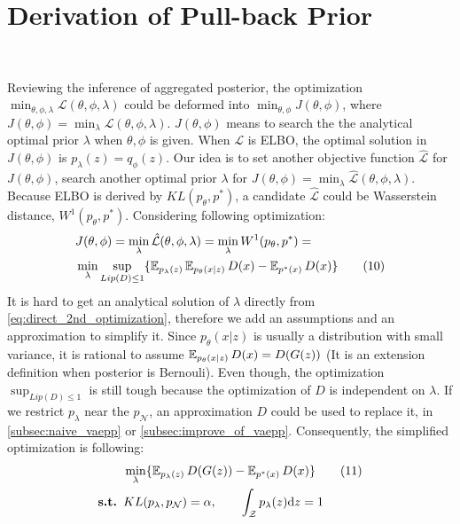 \section{Derivation of Pull-back Prior}~\label{subsec:inference}

Reviewing the inference of aggregated posterior, the optimization $\min_{\theta, \phi, \lambda} \mathcal{L}(\theta, \phi, \lambda)$ could be deformed into $\min_{\theta, \phi} J(\theta, \phi)$, where $J(\theta, \phi) = \min_{\lambda} \mathcal{L}(\theta, \phi, \lambda)$. $J(\theta, \phi)$ means to search the the analytical optimal prior $\lambda$ when $\theta, \phi$ is given. When $\mathcal{L}$ is ELBO, the optimal solution in $J(\theta, \phi)$ is $p_\lambda(z) = q_\phi(z)$. Our idea is to set another objective function $\hat{\mathcal{L}}$ for $J(\theta, \phi)$, \IE search another optimal prior $\lambda$ for $J(\theta, \phi) = \min_{\lambda} \hat{\mathcal{L}}(\theta, \phi, \lambda)$. Because ELBO is derived by $KL(p_\theta, p^*)$, a candidate $\hat{\mathcal{L}}$ could be Wasserstein distance, $W^1(p_\theta, p^*)$. Considering following optimization:
\begin{align*}\label{eq:direct_2nd_optimization}
	& J(\theta, \phi) = \min_{\lambda} \hat{\mathcal{L}}(\theta, \phi, \lambda) = \min_{\lambda} W^1(p_\theta, p^*) = \\
	& \min_{\lambda} \sup_{Lip(D) \leq 1} \{\operatorname{\mathbb{E}}_{p_\lambda(z)} \operatorname{\mathbb{E}}_{p_\theta(x|z)} D(x)  - \operatorname{\mathbb{E}}_{p^*(x)} D(x)\} 
	\tag{10}
\end{align*}
It is hard to get an analytical solution of $\lambda$ directly from \cref{eq:direct_2nd_optimization}, therefore we add an assumptions and an approximation to simplify it. Since $p_\theta(x|z)$ is usually a distribution with small variance, it is rational to assume $\operatorname{\mathbb{E}}_{p_\theta(x|z)} D(x) = D(G(z))$ (It is an extension definition when posterior is Bernouli). Even though, the optimization $\sup_{Lip(D) \leq 1}$ is still tough because the optimization of $D$ is independent on $\lambda$. If we restrict $p_\lambda$ near the $p_\mathcal{N}$, an approximation $D$ could be used to replace it, \EG in \cref{subsec:naive_vaepp} or \cref{subsec:improve_of_vaepp}. Consequently, the simplified optimization is following:
\begin{align*}\label{eq:final_optimization}
	& \min_{\lambda} \{\operatorname{\mathbb{E}}_{p_\lambda(z)} D(G(z))  - \operatorname{\mathbb{E}}_{p^*(x)} D(x)\} \tag{11} \\
	{\textbf{s.t. }} & KL(p_\lambda, p_\mathcal{N}) = \alpha, \qquad \int_{\mathcal{Z}} p_\lambda(z) \mathrm{d} z = 1
\end{align*}
